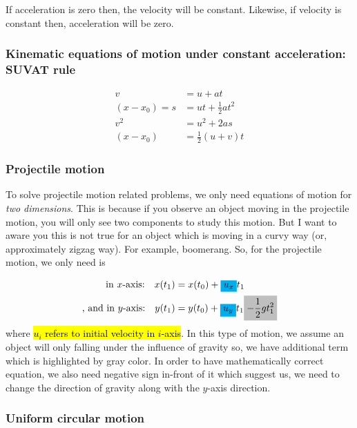 \documentclass[12pt,a4paper]{article}
\newcommand{\mathcolorbox}[2]{\colorbox{#1}{$\displaystyle #2$}}
\DeclareRobustCommand{\hlcyan}[1]{{\sethlcolor{cyan}\hl{#1}}}
\begin{document}
If acceleration is zero then, the velocity will be constant. Likewise, if velocity is constant then, acceleration will be zero.

\subsubsection*{Kinematic equations of motion under constant acceleration: SUVAT rule}
\begin{align}
v &= u + at\\
(x - x_{0}) = s &= ut + \frac{1}{2}at^{2} \\
v^{2} &= u^{2} + 2as \\
(x - x_{0}) &= \frac{1}{2}(u + v)t 
\end{align}

\subsubsection{Projectile motion}

To solve projectile motion related problems, we only need equations of motion for \emph{two dimensions}. This is because if you observe an object moving in the projectile motion, you will only see two components to study this motion. But I want to aware you this is not true for an object which is moving in a curvy way (or, approximately zigzag way). For example, boomerang. So, for the projectile motion, we only need is

\begin{align*}
\text{in $x$-axis:\quad} x(t_{1}) &= x(t_{0}) + \mathcolorbox{cyan}{u_{x}}t_{1} \\
\text{, and in $y$-axis:\quad} y(t_{1}) &= y(t_{0}) + \mathcolorbox{cyan}{u_{y}}t_{1} \mathcolorbox{lightgray}{ - \frac{1}{2}g t^{2}_{1}}
\end{align*}
where \hlcyan{$u_{i}$ refers to initial velocity in $i$-axis}. In this type of motion, we assume an object will only falling under the influence of gravity so, we have additional term which is highlighted by gray color. In order to have mathematically correct equation, we also need negative sign in-front of it which suggest us, we need to change the direction of gravity along with the $y$-axis direction. 

\subsubsection{Uniform circular motion}
\end{document}

